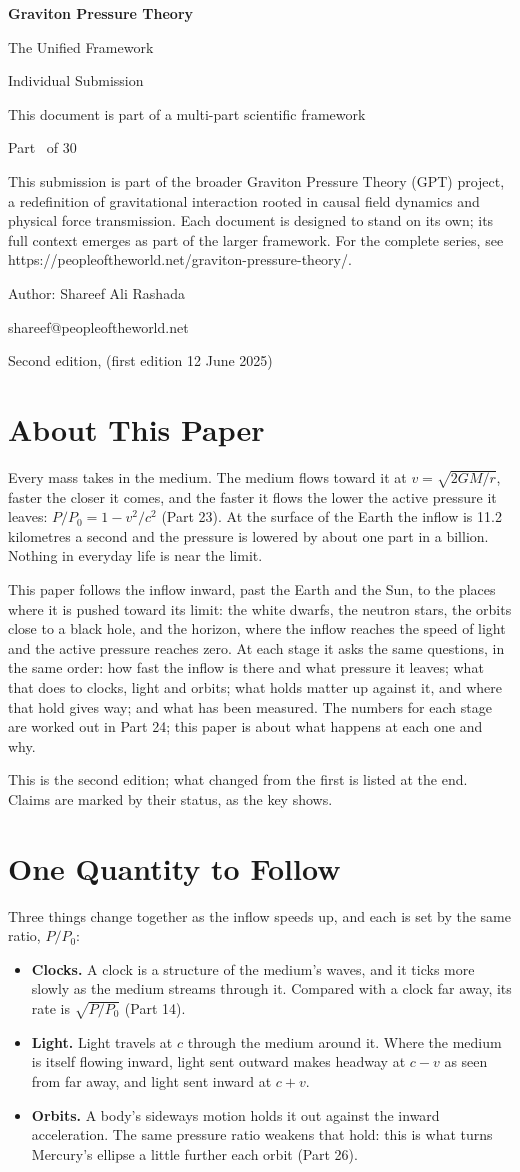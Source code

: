 \documentclass[11pt,a4paper]{article}
\makeatletter
\newcommand{\gptitle}{%
  \begin{titlepage}\centering
  \vspace*{3cm}
  {\Huge\bfseries Graviton Pressure Theory\par}\vspace{0.8cm}
  {\Large The Unified Framework\par}\vspace{0.2cm}
  {\large Individual Submission\par}\vspace{0.6cm}
  {\normalsize This document is part of a multi-part scientific framework\par}\vspace{2cm}
  {\normalsize Part \gptpart\ of 30\par}\vspace{0.8cm}
  {\huge\bfseries \gpttitle\par}\vspace{0.6cm}
  {\Large \gptsubtitle\par}\vspace{1.5cm}
  {\small\begin{minipage}{0.75\textwidth}\centering This submission is part of the broader Graviton Pressure Theory (GPT) project, a redefinition of gravitational interaction rooted in causal field dynamics and physical force transmission. Each document is designed to stand on its own; its full context emerges as part of the larger framework. For the complete series, see https://peopleoftheworld.net/graviton-pressure-theory/.\end{minipage}\par}
  \vfill
  {\large Author: Shareef Ali Rashada\par}\vspace{0.2cm}
  {\normalsize shareef@peopleoftheworld.net\par}\vspace{0.5cm}
  {\normalsize Second edition, \gptdate \quad (first edition 12 June 2025)\par}
  \end{titlepage}
  \setcounter{page}{1}\tableofcontents\clearpage}
\makeatother
\begin{document}
\gptitle

\section*{About This Paper}

Every mass takes in the medium. The medium flows toward it at $v=\sqrt{2GM/r}$, faster the closer it comes, and the faster it flows the lower the active pressure it leaves: $P/P_0 = 1 - v^2/c^2$ (Part 23). At the surface of the Earth the inflow is 11.2 kilometres a second and the pressure is lowered by about one part in a billion. Nothing in everyday life is near the limit.

This paper follows the inflow inward, past the Earth and the Sun, to the places where it is pushed toward its limit: the white dwarfs, the neutron stars, the orbits close to a black hole, and the horizon, where the inflow reaches the speed of light and the active pressure reaches zero. At each stage it asks the same questions, in the same order: how fast the inflow is there and what pressure it leaves; what that does to clocks, light and orbits; what holds matter up against it, and where that hold gives way; and what has been measured. The numbers for each stage are worked out in Part 24; this paper is about what happens at each one and why.

This is the second edition; what changed from the first is listed at the end. Claims are marked by their status, as the key shows.

\statuskey

\section{One Quantity to Follow}

Three things change together as the inflow speeds up, and each is set by the same ratio, $P/P_0$:
\begin{itemize}
\item \textbf{Clocks.} A clock is a structure of the medium's waves, and it ticks more slowly as the medium streams through it. Compared with a clock far away, its rate is $\sqrt{P/P_0}$ (Part 14).
\item \textbf{Light.} Light travels at $c$ through the medium around it. Where the medium is itself flowing inward, light sent outward makes headway at $c-v$ as seen from far away, and light sent inward at $c+v$.
\item \textbf{Orbits.} A body's sideways motion holds it out against the inward acceleration. The same pressure ratio weakens that hold: this is what turns Mercury's ellipse a little further each orbit (Part 26).
\end{itemize}
\end{document}
